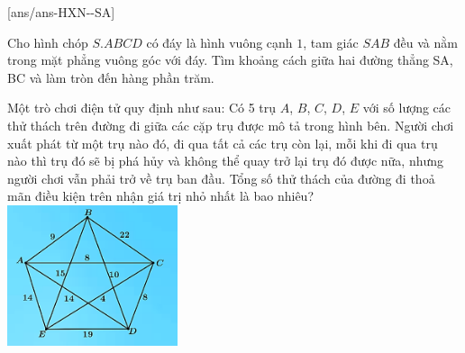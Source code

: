 \caukq
{}[ans/ans-HXN-\sode-SA]
\begin{ex}%
 Cho hình chóp $S.ABCD$ có đáy là hình vuông cạnh $ 1$, tam giác $SAB$ đều và nằm trong mặt phẳng vuông góc với đáy. Tìm khoảng cách giữa hai đường thẳng SA, BC và làm tròn đến hàng phần trăm.
 \end{ex}
 \begin{ex}%
\immini
{
    Một trò chơi điện tử quy định như sau: Có 5 trụ $ A$, $B$, $C$, $D$, $E$ với số lượng các thử thách trên đường đi giữa các cặp trụ được mô tả trong hình bên. Người chơi xuất phát từ một trụ nào đó, đi qua tất cả các trụ còn lại, mỗi khi đi qua trụ nào thì trụ đó sẽ bị phá hủy và không thể quay trở lại trụ đó được nữa, nhưng người chơi vẫn phải trở về trụ ban đầu. Tổng số thử thách của đường đi thoả mãn điều kiện trên nhận giá trị nhỏ nhất là bao nhiêu?
}
{
    \includegraphics[width=5cm]{img/HXN-12-18}
}
\end{ex}
